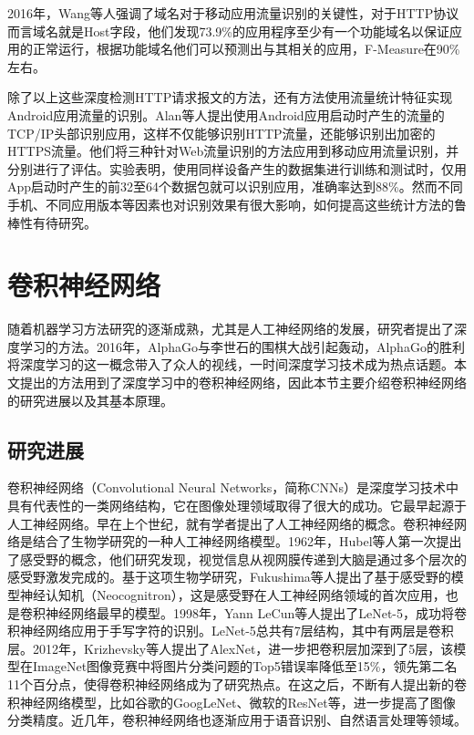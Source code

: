 2016年，Wang等人强调了域名对于移动应用流量识别的关键性\supercite{wang2016whatapp}，对于HTTP协议而言域名就是Host字段，他们发现73.9\%的应用程序至少有一个功能域名以保证应用的正常运行，根据功能域名他们可以预测出与其相关的应用，F-Measure在90\%左右。

除了以上这些深度检测HTTP请求报文的方法，还有方法使用流量统计特征实现Android应用流量的识别。Alan等人提出使用Android应用启动时产生的流量的TCP/IP头部识别应用，这样不仅能够识别HTTP流量，还能够识别出加密的HTTPS流量\supercite{alan2016can}。他们将三种针对Web流量识别的方法\cite{sun2002statistical,liberatore2006inferring,herrmann2009website}应用到移动应用流量识别，并分别进行了评估。实验表明，使用同样设备产生的数据集进行训练和测试时，仅用App启动时产生的前32至64个数据包就可以识别应用，准确率达到88\%。然而不同手机、不同应用版本等因素也对识别效果有很大影响，如何提高这些统计方法的鲁棒性有待研究。



\section{卷积神经网络}
随着机器学习方法研究的逐渐成熟，尤其是人工神经网络的发展，研究者提出了深度学习的方法。2016年，AlphaGo与李世石的围棋大战引起轰动，AlphaGo的胜利将深度学习的这一概念带入了众人的视线，一时间深度学习技术成为热点话题。本文提出的方法用到了深度学习中的卷积神经网络，因此本节主要介绍卷积神经网络的研究进展以及其基本原理。

\subsection{研究进展}
卷积神经网络（Convolutional Neural Networks，简称CNNs）是深度学习技术中具有代表性的一类网络结构，它在图像处理领域取得了很大的成功。它最早起源于人工神经网络。早在上个世纪，就有学者提出了人工神经网络的概念\supercite{mcculloch1943logical}。卷积神经网络是结合了生物学研究的一种人工神经网络模型。1962年，Hubel等人第一次提出了感受野的概念，他们研究发现，视觉信息从视网膜传递到大脑是通过多个层次的感受野激发完成的\supercite{hubel1962receptive}。基于这项生物学研究，Fukushima等人提出了基于感受野的模型神经认知机\supercite{fukushima1982neocognitron}（Neocognitron），这是感受野在人工神经网络领域的首次应用，也是卷积神经网络最早的模型。1998年，Yann LeCun等人提出了LeNet-5\supercite{lecun1998gradient}，成功将卷积神经网络应用于手写字符的识别。LeNet-5总共有7层结构，其中有两层是卷积层。2012年，Krizhevsky等人提出了AlexNet\supercite{krizhevsky2012imagenet}，进一步把卷积层加深到了5层，该模型在ImageNet图像竞赛中将图片分类问题的Top5错误率降低至15\%，领先第二名11个百分点，使得卷积神经网络成为了研究热点。在这之后，不断有人提出新的卷积神经网络模型，比如谷歌的GoogLeNet、微软的ResNet等，进一步提高了图像分类精度。近几年，卷积神经网络也逐渐应用于语音识别\supercite{abdel2012applying,abdel2014convolutional}、自然语言处理\supercite{collobert2011natural,zhang2015character}等领域。




